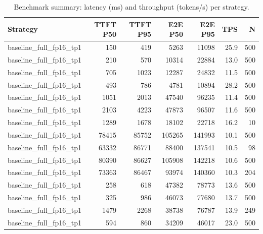\begin{table}
\caption{Benchmark summary: latency (ms) and throughput (tokens/s) per strategy.}
\label{tab:summary}
\begin{tabular}{lrrrrrr}
\toprule
Strategy & TTFT P50 & TTFT P95 & E2E P50 & E2E P95 & TPS & N \\
\midrule
baseline_full_fp16_tp1 & 150 & 419 & 5263 & 11098 & 25.9 & 500 \\
baseline_full_fp16_tp1 & 210 & 570 & 10314 & 22884 & 13.0 & 500 \\
baseline_full_fp16_tp1 & 705 & 1023 & 12287 & 24832 & 11.5 & 500 \\
baseline_full_fp16_tp1 & 493 & 786 & 4781 & 10894 & 28.2 & 500 \\
baseline_full_fp16_tp1 & 1051 & 2013 & 47540 & 96235 & 11.4 & 500 \\
baseline_full_fp16_tp1 & 2103 & 4223 & 47873 & 96507 & 11.6 & 500 \\
baseline_full_fp16_tp1 & 1289 & 1678 & 18102 & 22718 & 16.2 & 10 \\
baseline_full_fp16_tp1 & 78415 & 85752 & 105265 & 141993 & 10.1 & 500 \\
baseline_full_fp16_tp1 & 63332 & 86771 & 88400 & 137541 & 10.5 & 98 \\
baseline_full_fp16_tp1 & 80390 & 86627 & 105908 & 142218 & 10.6 & 500 \\
baseline_full_fp16_tp1 & 73363 & 86467 & 93974 & 140360 & 10.3 & 204 \\
baseline_full_fp16_tp1 & 258 & 618 & 47382 & 78773 & 13.6 & 500 \\
baseline_full_fp16_tp1 & 325 & 986 & 46073 & 77680 & 13.7 & 500 \\
baseline_full_fp16_tp1 & 1479 & 2268 & 38738 & 76787 & 13.9 & 249 \\
baseline_full_fp16_tp1 & 594 & 860 & 34209 & 46017 & 23.0 & 500 \\
\bottomrule
\end{tabular}
\end{table}
